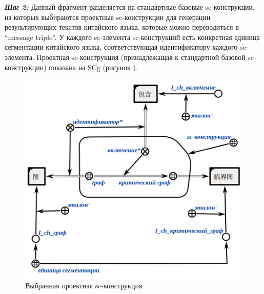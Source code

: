 \textbf{\textit{Шаг 2:}} Данный фрагмент разделяется на стандартные базовые sc-конструкции, из которых выбираются проектные sc-конструкции для генерации результирующих текстов китайского языка, которые можно переводиться в ``message triple''. У каждого sc-элемента sc-конструкций есть конкретная единица сегментации китайского языка, соответствующая идентификатору каждого sc-элемента. Проектная sc-конструкция (принадлежащая к стандартной базовой sc-конструкции) показана на SCg (рисунок \textit{}).
\begin{figure}[H]
	\centering
	\includegraphics[scale=0.8]{images/part4/chapter_chinese/candidate_sc_structure.png}
	\caption{Выбранная проектная sc-конструкция}
	\label{fig:candidate-sc-construction}
\end{figure}

